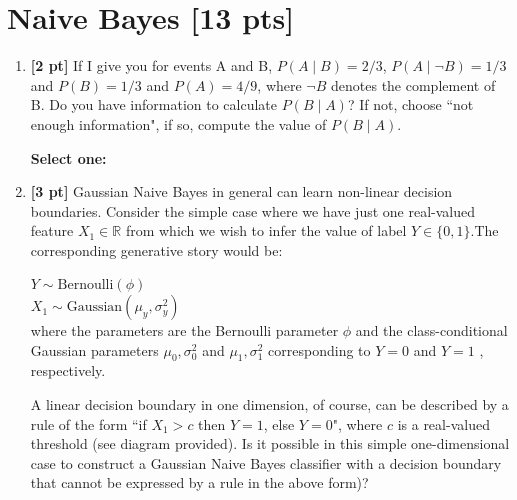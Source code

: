 \documentclass{article}
\renewcommand{\circle}{\tikz\draw[black] (0,0) circle (1ex);}
\begin{document}
\section{Naive Bayes [13 pts]}
\begin{enumerate}

    \item \textbf{[2 pt]} If I give you for events A and B, $P(A\mid B) = 2/3$, $P(A\mid \neg B) = 1/3$ and $P(B) = 1/3$ and $P(A) = 4/9$, where $\neg B$ denotes the complement of B. Do you have information to calculate $P(B\mid A)$? If not, choose ``not enough information", if so, compute the value of $P(B\mid A)$.

    \textbf{Select one:}
    
    \item \textbf{[3 pt]} Gaussian Naive Bayes in general can learn non-linear decision boundaries. Consider the simple case where we have just one real-valued feature $X_1\in\mathbb{R}$ from which we wish to infer the value of label $Y\in\{0,1\}$.The corresponding generative story would be:
    
    $Y \sim \text{Bernoulli}(\phi)$\\
    $X_1 \sim \text{Gaussian}(\mu_y, \sigma^2_y)$\\
    where the parameters are the Bernoulli parameter $\phi$  and the class-conditional Gaussian parameters $\mu_0, \sigma^2_0$ and $\mu_1, \sigma^2_1$   corresponding to $Y=0$ and $Y=1$ , respectively.

    A linear decision boundary in one dimension, of course, can be described by a rule of the form ``if $X_1>c$  then $Y=1$, else $Y=0$", where $c$ is a real-valued threshold (see diagram provided). Is it possible in this simple one-dimensional case to construct a Gaussian Naive Bayes classifier with a decision boundary that cannot be expressed by a rule in the above form)?


\end{enumerate}
\end{document}
